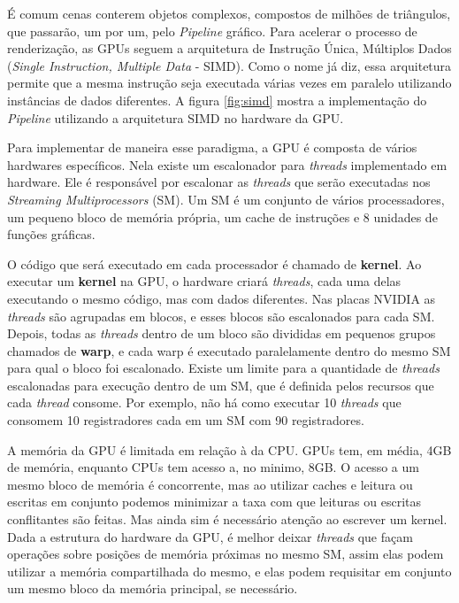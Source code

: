     É comum cenas conterem objetos complexos, compostos de milhões de triângulos, que passarão, um por um, pelo
\textit{Pipeline} gráfico. Para acelerar o processo de renderização, as GPUs seguem a arquitetura de Instrução Única,
Múltiplos Dados (\textit{Single Instruction, Multiple Data} - SIMD). Como o nome já diz, essa arquitetura permite que
a mesma instrução seja executada várias vezes em paralelo utilizando instâncias de dados diferentes. A figura
\ref{fig:simd} mostra a implementação do \textit{Pipeline} utilizando a arquitetura SIMD no hardware da GPU.

    Para implementar de maneira esse paradigma, a GPU é composta de vários hardwares específicos. Nela existe um
escalonador para \textit{threads} implementado em hardware. Ele é responsável por escalonar as \textit{threads} que serão
executadas nos \textit{Streaming Multiprocessors} (SM). Um SM é um conjunto de vários processadores, um pequeno bloco de
memória própria, um cache de instruções e 8 unidades de funções gráficas.

    O código que será executado em cada processador é chamado de \textbf{kernel}. Ao executar um \textbf{kernel} na GPU, o
hardware criará \textit{threads}, cada uma delas executando o mesmo código, mas com dados diferentes. Nas placas NVIDIA as \textit{threads}
são agrupadas em blocos, e esses blocos são escalonados para cada SM. Depois, todas as \textit{threads} dentro de um bloco são
divididas em pequenos grupos chamados de \textbf{warp}, e cada warp é executado paralelamente dentro do
mesmo SM para qual o bloco foi escalonado. Existe um limite para a quantidade de \textit{threads} escalonadas para execução
dentro de um SM, que é definida pelos recursos que cada \textit{thread} consome. Por exemplo, não há como executar 10 \textit{threads}
que consomem 10 registradores cada em um SM com 90 registradores.

    A memória da GPU é limitada em relação à da CPU. GPUs tem, em média, 4GB
de memória, enquanto CPUs tem acesso a, no minimo, 8GB. O acesso a um mesmo bloco de memória é concorrente, mas ao utilizar caches e leitura
ou escritas em conjunto podemos minimizar a taxa com que leituras ou escritas conflitantes são feitas. Mas ainda sim é
necessário atenção ao escrever um kernel. Dada a estrutura do hardware da GPU, é melhor deixar \textit{threads} que façam
operações sobre posições de memória próximas no mesmo SM, assim elas podem utilizar a memória compartilhada do mesmo, e
elas podem requisitar em conjunto um mesmo bloco da memória principal, se necessário.

